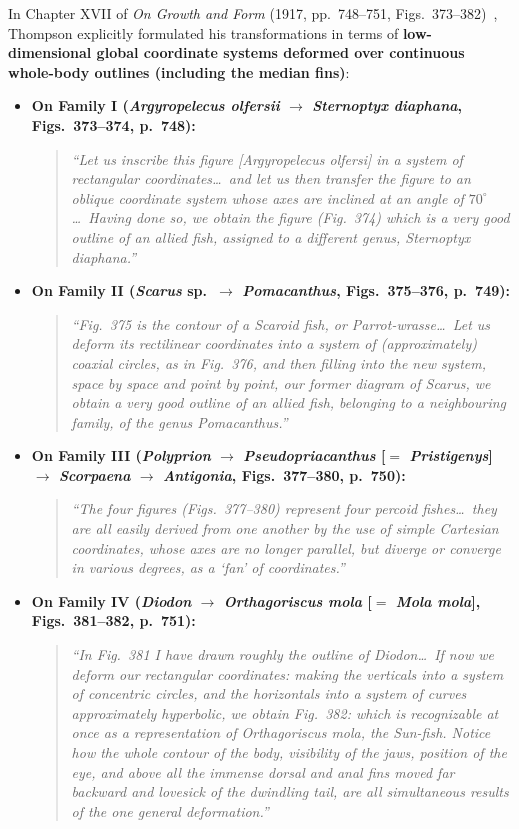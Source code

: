 \documentclass[11pt,a4paper]{article}
\theoremstyle{definition}
\theoremstyle{remark}
\begin{document}
In Chapter XVII of \emph{On Growth and Form} (1917, pp.\ 748--751, Figs.\ 373--382)~\cite{Thompson1917}, Thompson explicitly formulated his transformations in terms of \textbf{low-dimensional global coordinate systems deformed over continuous whole-body outlines (including the median fins)}:
\begin{itemize}
  \item \textbf{On Family I (\emph{Argyropelecus olfersii} $\to$ \emph{Sternoptyx diaphana}, Figs.\ 373--374, p.\ 748):}
  \begin{quote}
    \emph{``Let us inscribe this figure [Argyropelecus olfersi] in a system of rectangular coordinates\dots\ and let us then transfer the figure to an oblique coordinate system whose axes are inclined at an angle of $70^\circ$\dots\ Having done so, we obtain the figure (Fig.\ 374) which is a very good outline of an allied fish, assigned to a different genus, Sternoptyx diaphana.''}
  \end{quote}
  \item \textbf{On Family II (\emph{Scarus} sp.\ $\to$ \emph{Pomacanthus}, Figs.\ 375--376, p.\ 749):}
  \begin{quote}
    \emph{``Fig.\ 375 is the contour of a Scaroid fish, or Parrot-wrasse\dots\ Let us deform its rectilinear coordinates into a system of (approximately) coaxial circles, as in Fig.\ 376, and then filling into the new system, space by space and point by point, our former diagram of Scarus, we obtain a very good outline of an allied fish, belonging to a neighbouring family, of the genus Pomacanthus.''}
  \end{quote}
  \item \textbf{On Family III (\emph{Polyprion} $\to$ \emph{Pseudopriacanthus} [$=$ \emph{Pristigenys}] $\to$ \emph{Scorpaena} $\to$ \emph{Antigonia}, Figs.\ 377--380, p.\ 750):}
  \begin{quote}
    \emph{``The four figures (Figs.\ 377--380) represent four percoid fishes\dots\ they are all easily derived from one another by the use of simple Cartesian coordinates, whose axes are no longer parallel, but diverge or converge in various degrees, as a `fan' of coordinates.''}
  \end{quote}
  \item \textbf{On Family IV (\emph{Diodon} $\to$ \emph{Orthagoriscus mola} [$=$ \emph{Mola mola}], Figs.\ 381--382, p.\ 751):}
  \begin{quote}
    \emph{``In Fig.\ 381 I have drawn roughly the outline of Diodon\dots\ If now we deform our rectangular coordinates: making the verticals into a system of concentric circles, and the horizontals into a system of curves approximately hyperbolic, we obtain Fig.\ 382: which is recognizable at once as a representation of Orthagoriscus mola, the Sun-fish. Notice how the whole contour of the body, visibility of the jaws, position of the eye, and above all the immense dorsal and anal fins moved far backward and lovesick of the dwindling tail, are all simultaneous results of the one general deformation.''}
  \end{quote}
\end{itemize}
\end{document}
